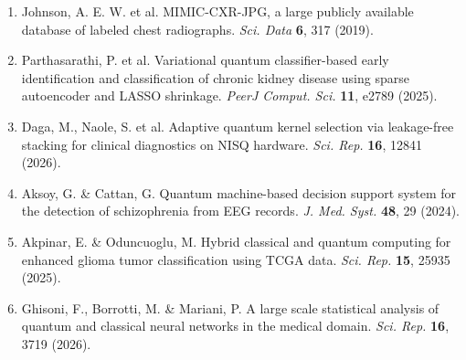 \documentclass[10pt,a4paper]{article}
\begin{document}
\begin{enumerate}
  \item Johnson, A. E. W. et al. MIMIC-CXR-JPG, a large publicly available database of labeled chest radiographs. \textit{Sci. Data} \textbf{6}, 317 (2019).
  \item Parthasarathi, P. et al. Variational quantum classifier-based early identification and classification of chronic kidney disease using sparse autoencoder and LASSO shrinkage. \textit{PeerJ Comput. Sci.} \textbf{11}, e2789 (2025).
  \item Daga, M., Naole, S. et al. Adaptive quantum kernel selection via leakage-free stacking for clinical diagnostics on NISQ hardware. \textit{Sci. Rep.} \textbf{16}, 12841 (2026).
  \item Aksoy, G. \& Cattan, G. Quantum machine-based decision support system for the detection of schizophrenia from EEG records. \textit{J. Med. Syst.} \textbf{48}, 29 (2024).
  \item Akpinar, E. \& Oduncuoglu, M. Hybrid classical and quantum computing for enhanced glioma tumor classification using TCGA data. \textit{Sci. Rep.} \textbf{15}, 25935 (2025).
  \item Ghisoni, F., Borrotti, M. \& Mariani, P. A large scale statistical analysis of quantum and classical neural networks in the medical domain. \textit{Sci. Rep.} \textbf{16}, 3719 (2026).
\end{enumerate}
\end{document}
